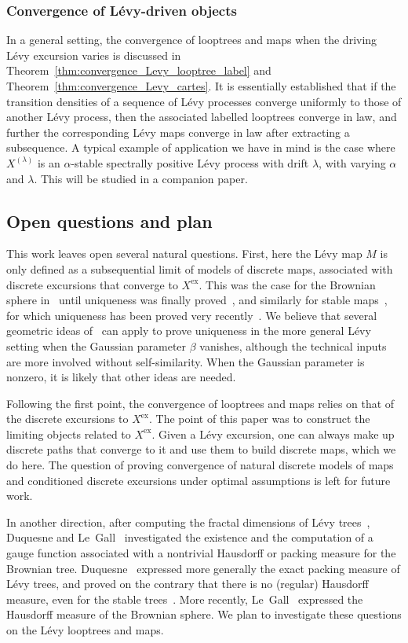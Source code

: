 \documentclass[british, a4paper,11pt]{article}
\numberwithin{equation}{section}
\theoremstyle{definition}
\newcommand{\Map}{M}
\newcommand{\exc}{\mathrm{ex}}
\begin{document}
\subsubsection*{Convergence of L\'evy-driven objects} In a general setting, the convergence of looptrees and maps when the driving L\'evy excursion varies is discussed in Theorem~\ref{thm:convergence_Levy_looptree_label} and Theorem~\ref{thm:convergence_Levy_cartes}. It is essentially established that if the transition densities of a sequence of L\'evy processes converge uniformly to those of another L\'evy process, then the associated labelled looptrees converge in law, and further the corresponding L\'evy maps converge in law after extracting a subsequence. A typical example of application we have in mind is the case where $X^{(\lambda)}$ is an $\alpha$-stable spectrally positive L\'evy process with drift $\lambda$, with varying $\alpha$ and $\lambda$. This will be studied in a companion paper.


\subsection{Open questions and plan}

This work leaves open several natural questions. First, here the L\'evy map $\Map$ is only defined as a subsequential limit of models of discrete maps, associated with discrete excursions that converge to $X^{\exc}$.
This was the case for the Brownian sphere in~\cite{LG07} until uniqueness was finally proved~\cite{LG13, Mie13}, and similarly for stable maps~\cite{LGM11}, for which uniqueness has been proved very recently~\cite{CMR25}.
We believe that several geometric ideas of~\cite{CMR25} can apply to prove uniqueness in the more general L\'evy setting when the Gaussian parameter $\beta$ vanishes, although the technical inputs are more involved without self-similarity. When the Gaussian parameter is nonzero, it is likely that other ideas are needed.

Following the first point, the convergence of looptrees and maps relies on that of the discrete excursions to $X^{\exc}$. The point of this paper was to construct the limiting objects related to $X^{\exc}$.
Given a L\'evy excursion, one can always make up discrete paths that converge to it and use them to build discrete maps, which we do here. The question of proving convergence of natural discrete models of maps and conditioned discrete excursions under optimal assumptions is left for future work.

In another direction, after computing the fractal dimensions of L\'evy trees~\cite{DLG05}, Duquesne and Le~Gall~\cite{DLG06} investigated the existence and the computation of a gauge function associated with a nontrivial Hausdorff or packing measure for the Brownian tree. Duquesne~\cite{Duq12} expressed more generally the exact packing measure of L\'evy trees, and proved on the contrary that there is no (regular) Hausdorff measure, even for the stable trees~\cite{Duq10}. More recently, Le~Gall~\cite{LG22b} expressed the Hausdorff measure of the Brownian sphere. 
We plan to investigate these questions on the L\'evy looptrees and maps. 
\end{document}
